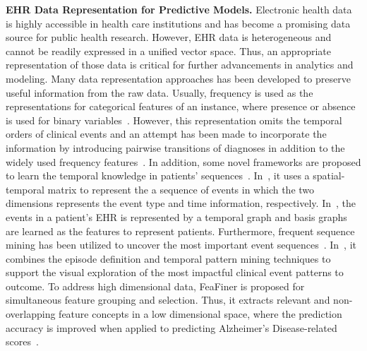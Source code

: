 \documentclass[journal,compsoc]{IEEEtran}
\begin{document}
\textbf{EHR Data Representation for Predictive Models. } Electronic health data is highly accessible in health care institutions and has become a promising data source for public health research. However, EHR data is heterogeneous and cannot be readily expressed in a unified vector space. Thus, an appropriate representation of those data is critical for further advancements in analytics and modeling. Many data representation approaches has been developed to preserve useful information from the raw data. Usually, frequency is used as the representations for categorical features of an instance, where presence or absence is used for binary variables~\cite{ng_personalized_2015, huang_toward_2014}. However, this representation omits the temporal orders of clinical events and an attempt has been made to incorporate the information by introducing pairwise transitions of diagnoses in addition to the widely used frequency features~\cite{zhang_mseq_2015}. In addition, some novel frameworks are proposed to learn the temporal knowledge in patients' sequences~\cite{wang_towards_2012, wang_framework_2012, liu_temporal_2015}. In~\cite{wang_framework_2012}, it uses a spatial-temporal matrix to represent the a sequence of events in which the two dimensions represents the event type and time information, respectively. In~\cite{liu_temporal_2015}, the events in a patient's EHR is represented by a temporal graph and basis graphs are learned as the features to represent patients. Furthermore, frequent sequence mining has been utilized to uncover the most important event sequences~\cite{gotz_methodology_2014, perer_frequence:_2014, perer_mining_2015}. In~\cite{gotz_methodology_2014}, it combines the episode definition and temporal pattern mining techniques to support the visual exploration of the most impactful clinical event patterns to outcome. To address high dimensional data, FeaFiner is proposed for simultaneous feature grouping and selection. Thus, it extracts relevant and non-overlapping feature concepts in a low dimensional space, where the prediction accuracy is improved when applied to predicting Alzheimer's Disease-related scores~\cite{zhou_feafiner:_2013}. 
\end{document}
